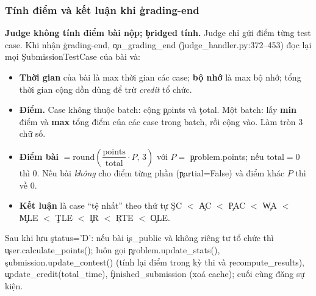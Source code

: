 
\subsubsection{Tính điểm và kết luận khi \texorpdfstring{\c{grading-end}}{grading-end}}\label{sec:scoring}
\textbf{Judge không tính điểm bài nộp; \c{bridged} tính.} Judge chỉ gửi điểm từng test case. Khi nhận \c{grading-end}, \c{on_grading_end} (\f{judge_handler.py:372--453}) đọc lại mọi \c{SubmissionTestCase} của bài và: \tS
\begin{itemize}
\item \textbf{Thời gian} của bài là max thời gian các case; \textbf{bộ nhớ} là max bộ nhớ; tổng thời gian cộng dồn dùng để trừ \emph{credit} tổ chức.
\item \textbf{Điểm.} Case không thuộc batch: cộng \c{points} và \c{total}. Một batch: lấy \textbf{min} điểm và \textbf{max} tổng điểm của các case trong batch, rồi cộng vào. Làm tròn 3 chữ số.
\item \textbf{Điểm bài} $=\mathrm{round}\!\left(\dfrac{\text{points}}{\text{total}}\cdot P,\,3\right)$ với $P=$ \c{problem.points}; nếu $\text{total}=0$ thì 0. Nếu bài \emph{không} cho điểm từng phần (\c{partial=False}) và điểm khác $P$ thì về 0.
\item \textbf{Kết luận} là case ``tệ nhất'' theo thứ tự \c{SC} $<$ \c{AC} $<$ \c{PAC} $<$ \c{WA} $<$ \c{MLE} $<$ \c{TLE} $<$ \c{IR} $<$ \c{RTE} $<$ \c{OLE}.
\end{itemize}
Sau khi lưu \c{status='D'}: nếu bài \c{is_public} và không riêng tư tổ chức thì \c{user.calculate_points()}; luôn gọi \c{problem.update_stats()}, \c{submission.update_contest()} (tính lại điểm trong kỳ thi và \c{recompute_results}), \c{update_credit(total_time)}, \c{finished_submission} (xoá cache); cuối cùng đăng sự kiện. \tS

